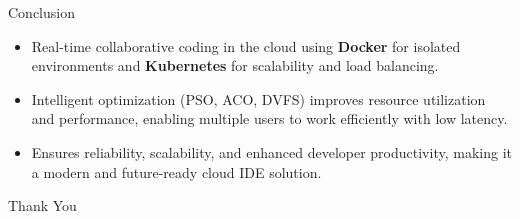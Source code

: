 \documentclass[aspectratio=169,11pt]{beamer}
\begin{document}
\begin{frame}{Conclusion}
  \begin{itemize}
    \item Real-time collaborative coding in the cloud using \textbf{Docker} for isolated environments and \textbf{Kubernetes} for scalability and load balancing.
    \item Intelligent optimization (PSO, ACO, DVFS) improves resource utilization and performance, enabling multiple users to work efficiently with low latency.
    \item Ensures reliability, scalability, and enhanced developer productivity, making it a modern and future-ready cloud IDE solution.
  \end{itemize}
  \vfill
  \centering\Large\color{aitblue}Thank You
\end{frame}
\end{document}
